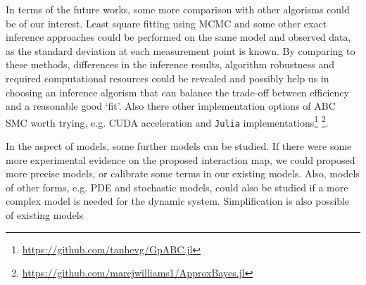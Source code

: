 
In terms of the future works, some more comparison with other algorisms could be of our interest. Least square fitting using MCMC \cite{ref:MCMC} and some other exact inference approaches could be performed on the same model and observed data, as the standard deviation at each measurement point is known. By comparing to these methods, differences in the inference results, algorithm robustness and required computational resources could be revealed and possibly help us in choosing an inference algorism that can balance the trade-off between efficiency and a reasonable good `fit'. Also there other implementation options of ABC SMC worth trying, e.g. CUDA acceleration and \verb|Julia| implementations\footnote[1]{\url{https://github.com/tanhevg/GpABC.jl}} \footnote[2]{\url{https://github.com/marcjwilliams1/ApproxBayes.jl}}.

In the aspect of models, some further models can be studied. If there were some more experimental evidence on the proposed interaction map, we could proposed more precise models, or calibrate some terms in our existing models. Also, models of other forms, e.g. PDE and stochastic models, could also be studied if a more complex model is needed for the dynamic system. Simplification is also possible of existing models